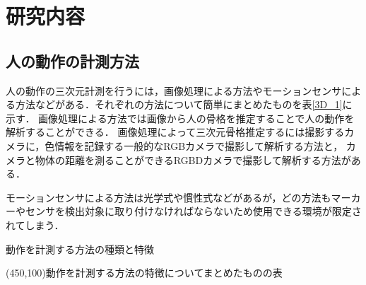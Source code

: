 \documentclass[titlepage]{jarticle}
\begin{document}
%
%
\section{研究内容}

%
%
\subsection{人の動作の計測方法}
%
人の動作の三次元計測を行うには，画像処理による方法やモーションセンサによる方法などがある．それぞれの方法について簡単にまとめたものを表\ref{3D_1}に示す．
画像処理による方法では画像から人の骨格を推定することで人の動作を解析することができる．
画像処理によって三次元骨格推定するには撮影するカメラに，色情報を記録する一般的なRGBカメラで撮影して解析する方法と，
カメラと物体の距離を測ることができるRGBDカメラで撮影して解析する方法がある．

モーションセンサによる方法は光学式や慣性式などがあるが，どの方法もマーカーやセンサを検出対象に取り付けなければならないため使用できる環境が限定されてしまう．

\begin{table}[t!]
  \centering
  \caption{動作を計測する方法の種類と特徴}
  \framebox(450,100){動作を計測する方法の特徴についてまとめたものの表}
  \label{3D_1}
\end{table}

\end{document}
